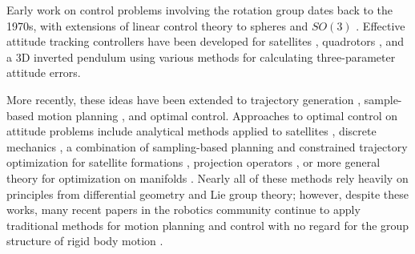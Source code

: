 \documentclass{svproc}
\begin{document}
    Early work on control problems involving the rotation group dates back to the 1970s, with extensions of linear control theory to spheres \cite{Brockett1973} and $SO(3)$ \cite{Baillieul1978}. Effective attitude tracking controllers have been developed for satellites \cite{wie1985quaternion}, quadrotors \cite{Fresk2013,Liu2015,lee2010geometric,Johnson2005,watterson2020control,mellinger2011minimum}, and a 3D inverted pendulum \cite{Chaturvedi2009}  using various methods for calculating three-parameter attitude errors. 
    
    More recently, these ideas have been extended to trajectory generation \cite{Zefran1998}, sample-based motion planning \cite{Zefran1999,Kuffner2004}, and optimal control. Approaches to optimal control on attitude problems include analytical methods applied to satellites \cite{Spindler1998}, discrete mechanics \cite{Kobilarov2011,Kobilarov2014,Lee2008}, a combination of sampling-based planning and constrained trajectory optimization for satellite formations \cite{Garcia2005, Aoude2008}, projection operators \cite{Saccon2013}, or more general theory for optimization on manifolds \cites{watterson2018trajectory}. Nearly all of these methods rely heavily on principles from differential geometry and Lie group theory; however, despite these works, many recent papers in the robotics community continue to apply traditional methods for motion planning and control with no regard for the group structure of rigid body motion \cite{Alothman2016,deCrousaz2015,Williams2017,Geisert2016}.
    
\end{document}
